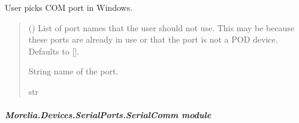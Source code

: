 \documentclass[letterpaper,10pt,english]{sphinxmanual}
\begin{document}
\begin{fulllineitems}
\begin{fulllineitems}
\label{\detokenize{Morelia.Devices.SerialPorts:Morelia.Devices.SerialPorts.PortAccess.FindPorts._ChoosePortWindows}}
\pysigstartsignatures
{}
\pysigstopsignatures
\sphinxAtStartPar
User picks COM port in Windows.
\begin{quote}\begin{description}
\sphinxAtStartPar
{} (\sphinxstyleliteralemphasis{\sphinxupquote{{[}}}\sphinxstyleliteralemphasis{\sphinxupquote{{]}}}\sphinxstyleliteralemphasis{\sphinxupquote{, }}) \textendash{} List of port names that the user should                 not use. This may be because these ports are already in use or that                 the port is not a POD device. Defaults to {[}{]}.

\sphinxAtStartPar
String name of the port.

\sphinxAtStartPar
str

\end{description}\end{quote}

\end{fulllineitems}


\end{fulllineitems}



\subparagraph{Morelia.Devices.SerialPorts.SerialComm module}
\label{\detokenize{Morelia.Devices.SerialPorts:module-Morelia.Devices.SerialPorts.SerialComm}}\label{\detokenize{Morelia.Devices.SerialPorts:morelia-devices-serialports-serialcomm-module}}
\end{document}

